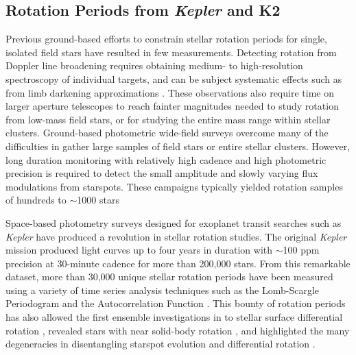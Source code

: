 \documentclass[12pt]{article}
\newcommand{\Kepler}{\textsl{Kepler}\xspace}
\begin{document}
\subsection{Rotation Periods from \Kepler and K2}
Previous ground-based efforts to constrain stellar rotation periods for single, isolated field stars have resulted in few measurements. Detecting rotation from Doppler line broadening requires obtaining medium- to high-resolution spectroscopy of individual targets, and can be subject systematic effects such as from limb darkening approximations \citep{collins1995}. These observations also require time on larger aperture telescopes to reach fainter magnitudes needed to study rotation from low-mass field stars, or for studying the entire mass range within stellar clusters. Ground-based photometric wide-field surveys overcome many of the difficulties in gather large samples of field stars or entire stellar clusters. However, long duration monitoring with relatively high cadence and high photometric precision is required to detect the small amplitude and slowly varying flux modulations from starspots. These campaigns typically yielded rotation samples of hundreds to $\sim$1000 stars \citep[e.g.][]{hartman2010,hartman2011}


Space-based photometry surveys designed for exoplanet transit searches such as \Kepler \citep{borucki2010} have produced a revolution in stellar rotation studies. The original \Kepler mission produced light curves up to four years in duration with $\sim$100 ppm precision at 30-minute cadence for more than 200,000 stars. From this remarkable dataset, more than 30,000 unique stellar rotation periods have been measured using a variety of time series analysis techniques such as the Lomb-Scargle Periodogram \citep{reinhold2013} and the Autocorrelation Function \citep[][]{mcquillan2014}.
This bounty of rotation periods has also allowed the first ensemble investigations in to stellar surface differential rotation \citep[e.g.][]{reinhold2013}, revealed stars with near solid-body rotation \citep{davenport2015a}, and highlighted the many degeneracies in disentangling starspot evolution and differential rotation \citep{aigrain2015}.
\end{document}
